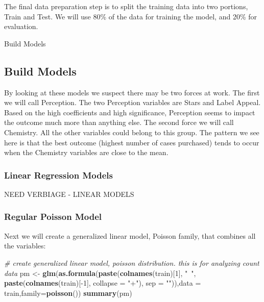 \documentclass[]{article}
\newenvironment{Shaded}{\begin{snugshade}}{\end{snugshade}}
\newcommand{\KeywordTok}[1]{\textcolor[rgb]{0.13,0.29,0.53}{\textbf{{#1}}}}
\newcommand{\DataTypeTok}[1]{\textcolor[rgb]{0.13,0.29,0.53}{{#1}}}
\newcommand{\DecValTok}[1]{\textcolor[rgb]{0.00,0.00,0.81}{{#1}}}
\newcommand{\StringTok}[1]{\textcolor[rgb]{0.31,0.60,0.02}{{#1}}}
\newcommand{\CommentTok}[1]{\textcolor[rgb]{0.56,0.35,0.01}{\textit{{#1}}}}
\newcommand{\NormalTok}[1]{{#1}}
\begin{document}
The final data preparation step is to split the training data into two
portions, Train and Test. We will use 80\% of the data for training the
model, and 20\% for evaluation.

\begin{center}
{\huge Build Models}
\end{center}

\subsection{Build Models}\label{build-models}

By looking at these models we suspect there may be two forces at work.
The first we will call Perception. The two Perception variables are
Stars and Label Appeal. Based on the high coefficients and high
significance, Perception seems to impact the outcome much more than
anything else. The second force we will call Chemistry. All the other
variables could belong to this group. The pattern we see here is that
the best outcome (highest number of cases purchased) tends to occur when
the Chemistry variables are close to the mean.

\subsubsection{Linear Regression Models}\label{linear-regression-models}

NEED VERBIAGE - LINEAR MODELS

\subsubsection{Regular Poisson Model}\label{regular-poisson-model}

Next we will create a generalized linear model, Poisson family, that
combines all the variables:

\begin{Shaded}
\begin{Highlighting}[]
\CommentTok{# create generalized linear model, poisson distribution.  this is for analyzing count data }
\NormalTok{pm <-}\StringTok{ }\KeywordTok{glm}\NormalTok{(}\KeywordTok{as.formula}\NormalTok{(}\KeywordTok{paste}\NormalTok{(}\KeywordTok{colnames}\NormalTok{(train)[}\DecValTok{1}\NormalTok{], }\StringTok{"~"}\NormalTok{, }\KeywordTok{paste}\NormalTok{(}\KeywordTok{colnames}\NormalTok{(train)[-}\DecValTok{1}\NormalTok{], }\DataTypeTok{collapse =} \StringTok{"+"}\NormalTok{), }\DataTypeTok{sep =} \StringTok{""}\NormalTok{)),}\DataTypeTok{data =} \NormalTok{train,}\DataTypeTok{family=}\KeywordTok{poisson}\NormalTok{()) }
\KeywordTok{summary}\NormalTok{(pm)}
\end{Highlighting}
\end{Shaded}
\end{document}
